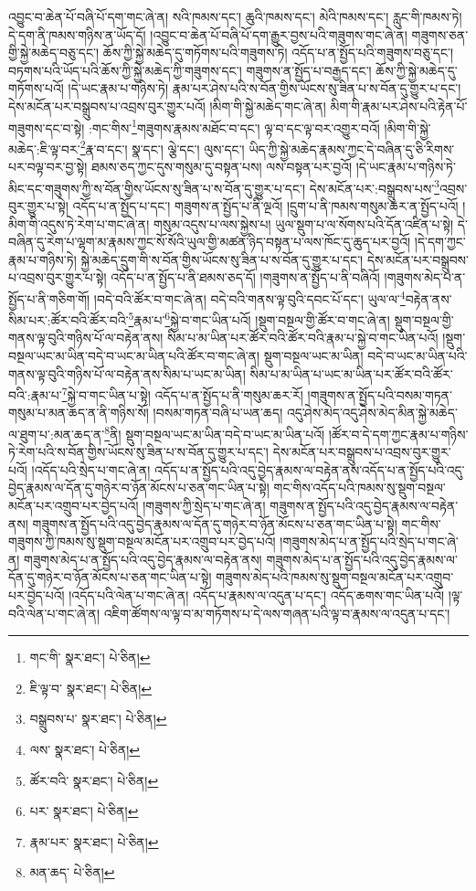 འབྱུང་བ་ཆེན་པོ་བཞི་པོ་དག་གང་ཞེ་ན། སའི་ཁམས་དང་། ཆུའི་ཁམས་དང་། མེའི་ཁམས་དང་། རླུང་གི་ཁམས་ཏེ། དེ་དག་ནི་ཁམས་གཉིས་ན་ཡོད་དོ། །འབྱུང་བ་ཆེན་པོ་བཞི་པོ་དག་རྒྱུར་བྱས་པའི་གཟུགས་གང་ཞེ་ན། གཟུགས་ཅན་གྱི་སྐྱེ་མཆེད་བཅུ་དང་། ཆོས་ཀྱི་སྐྱེ་མཆེད་དུ་གཏོགས་པའི་གཟུགས་ཏེ། འདོད་པ་ན་སྤྱོད་པའི་གཟུགས་བཅུ་དང་། བཏགས་པའི་ཡོད་པའི་ཆོས་ཀྱི་སྐྱེ་མཆེད་ཀྱི་གཟུགས་དང་། གཟུགས་ན་སྤྱོད་པ་བརྒྱད་དང་། ཆོས་ཀྱི་སྐྱེ་མཆེད་དུ་གཏོགས་པའོ། །དེ་ཡང་རྣམ་པ་གཉིས་ཏེ། རྣམ་པར་ཤེས་པའི་ས་བོན་གྱིས་ཡོངས་སུ་ཟིན་པ་ས་བོན་དུ་གྱུར་པ་དང་། དེས་མངོན་པར་བསྒྲུབས་པ་འབྲས་བུར་གྱུར་པའོ། །མིག་གི་སྐྱེ་མཆེད་གང་ཞེ་ན། མིག་གི་རྣམ་པར་ཤེས་པའི་རྟེན་པོ་གཟུགས་དང་བ་སྟེ། :གང་གིས་\footnote{གང་གི་  སྣར་ཐང་།  པེ་ཅིན། }གཟུགས་རྣམས་མཐོང་བ་དང་། ལྟ་བ་དང་ལྟ་བར་འགྱུར་བའོ། །མིག་གི་སྐྱེ་མཆེད་:ཇི་ལྟ་བར་\footnote{ཇི་ལྟ་བ་  སྣར་ཐང་།  པེ་ཅིན། }རྣ་བ་དང་། སྣ་དང་། ལྕེ་དང་། ལུས་དང་། ཡིད་ཀྱི་སྐྱེ་མཆེད་རྣམས་ཀྱང་དེ་བཞིན་དུ་ཅི་རིགས་པར་བལྟ་བར་བྱ་སྟེ། ཐམས་ཅད་ཀྱང་དུས་གསུམ་དུ་བསྟན་པས། ལས་བསྟན་པར་བྱའོ། །དེ་ཡང་རྣམ་པ་གཉིས་ཏེ་མིང་དང་གཟུགས་ཀྱི་ས་བོན་གྱིས་ཡོངས་སུ་ཟིན་པ་ས་བོན་དུ་གྱུར་པ་དང་། དེས་མངོན་པར་:བསྒྲུབས་པས་\footnote{བསྒྲུབས་པ་  སྣར་ཐང་།  པེ་ཅིན། }འབྲས་བུར་གྱུར་པ་སྟེ། འདོད་པ་ན་སྤྱོད་པ་དང་། གཟུགས་ན་སྤྱོད་པ་ནི་ལྔའོ། །དྲུག་པ་ནི་ཁམས་གསུམ་ཆར་ན་སྤྱོད་པའོ། །མིག་གི་འདུས་ཏེ་རེག་པ་གང་ཞེ་ན། གསུམ་འདུས་པ་ལས་སྐྱེས་པ། ཡུལ་སྡུག་པ་ལ་སོགས་པའི་དོན་འཛིན་པ་སྟེ། དེ་བཞིན་དུ་རེག་པ་ལྷག་མ་རྣམས་ཀྱང་སོ་སོའི་ཡུལ་གྱི་མཚན་ཉིད་བསྟན་པ་ལས་ཁོང་དུ་ཆུད་པར་བྱའོ། །དེ་དག་ཀྱང་རྣམ་པ་གཉིས་ཏེ། སྐྱེ་མཆེད་དྲུག་གི་ས་བོན་གྱིས་ཡོངས་སུ་ཟིན་པ་ས་བོན་དུ་གྱུར་པ་དང་། དེས་མངོན་པར་བསྒྲུབས་པ་འབྲས་བུར་གྱུར་པ་སྟེ། འདོད་པ་ན་སྤྱོད་པ་ནི་ཐམས་ཅད་དོ། །གཟུགས་ན་སྤྱོད་པ་ནི་བཞིའོ། །གཟུགས་མེད་པ་ན་སྤྱོད་པ་ནི་གཅིག་གོ། །བདེ་བའི་ཚོར་བ་གང་ཞེ་ན། བདེ་བའི་གནས་ལྟ་བུའི་དབང་པོ་དང་། ཡུལ་ལ་\footnote{ལས་  སྣར་ཐང་།  པེ་ཅིན། }བརྟེན་ནས་སིམ་པར་:ཚོར་བའི་ཚོར་བའི་\footnote{ཚོར་བའི་  སྣར་ཐང་།  པེ་ཅིན། }རྣམ་པ་\footnote{པར་  སྣར་ཐང་།  པེ་ཅིན། }སྐྱེ་བ་གང་ཡིན་པའོ། །སྡུག་བསྔལ་གྱི་ཚོར་བ་གང་ཞེ་ན། སྡུག་བསྔལ་གྱི་གནས་ལྟ་བུའི་གཉིས་པོ་ལ་བརྟེན་ནས། སིམ་པ་མ་ཡིན་པར་ཚོར་བའི་ཚོར་བའི་རྣམ་པ་སྐྱེ་བ་གང་ཡིན་པའོ། །སྡུག་བསྔལ་ཡང་མ་ཡིན་བདེ་བ་ཡང་མ་ཡིན་པའི་ཚོར་བ་གང་ཞེ་ན། སྡུག་བསྔལ་ཡང་མ་ཡིན། བདེ་བ་ཡང་མ་ཡིན་པའི་གནས་ལྟ་བུའི་གཉིས་པོ་ལ་བརྟེན་ནས་སིམ་པ་ཡང་མ་ཡིན། སིམ་པ་མ་ཡིན་པ་ཡང་མ་ཡིན་པར་ཚོར་བའི་ཚོར་བའི་:རྣམ་པ་\footnote{རྣམ་པར་  སྣར་ཐང་།  པེ་ཅིན། }སྐྱེ་བ་གང་ཡིན་པ་སྟེ། འདོད་པ་ན་སྤྱོད་པ་ནི་གསུམ་ཆར་རོ། །གཟུགས་ན་སྤྱོད་པའི་བསམ་གཏན་གསུམ་པ་མན་ཆད་ན་ནི་གཉིས་སོ། །བསམ་གཏན་བཞི་པ་ཡན་ཆད། འདུ་ཤེས་མེད་འདུ་ཤེས་མེད་མིན་སྐྱེ་མཆེད་ལ་ཐུག་པ་:མན་ཆད་ན་\footnote{མན་ཆད་  པེ་ཅིན། }ནི། སྡུག་བསྔལ་ཡང་མ་ཡིན་བདེ་བ་ཡང་མ་ཡིན་པའོ། །ཚོར་བ་དེ་དག་ཀྱང་རྣམ་པ་གཉིས་ཏེ་རེག་པའི་ས་བོན་གྱིས་ཡོངས་སུ་ཟིན་པ་ས་བོན་དུ་གྱུར་པ་དང་། དེས་མངོན་པར་བསྒྲུབས་པ་འབྲས་བུར་གྱུར་པའོ། །འདོད་པའི་སྲེད་པ་གང་ཞེ་ན། འདོད་པ་ན་སྤྱོད་པའི་འདུ་བྱེད་རྣམས་ལ་བརྟེན་ནས་འདོད་པ་ན་སྤྱོད་པའི་འདུ་བྱེད་རྣམས་ལ་དོན་དུ་གཉེར་བ་ཉོན་མོངས་པ་ཅན་གང་ཡིན་པ་སྟེ། གང་གིས་འདོད་པའི་ཁམས་སུ་སྡུག་བསྔལ་མངོན་པར་འགྲུབ་པར་བྱེད་པའོ། །གཟུགས་ཀྱི་སྲེད་པ་གང་ཞེ་ན། གཟུགས་ན་སྤྱོད་པའི་འདུ་བྱེད་རྣམས་ལ་བརྟེན་ནས། གཟུགས་ན་སྤྱོད་པའི་འདུ་བྱེད་རྣམས་ལ་དོན་དུ་གཉེར་བ་ཉོན་མོངས་པ་ཅན་གང་ཡིན་པ་སྟེ། གང་གིས་གཟུགས་ཀྱི་ཁམས་སུ་སྡུག་བསྔལ་མངོན་པར་འགྲུབ་པར་བྱེད་པའོ། །གཟུགས་མེད་པ་ན་སྤྱོད་པའི་སྲེད་པ་གང་ཞེ་ན། གཟུགས་མེད་པ་ན་སྤྱོད་པའི་འདུ་བྱེད་རྣམས་ལ་བརྟེན་ནས། གཟུགས་མེད་པ་ན་སྤྱོད་པའི་འདུ་བྱེད་རྣམས་ལ་དོན་དུ་གཉེར་བ་ཉོན་མོངས་པ་ཅན་གང་ཡིན་པ་སྟེ། གཟུགས་མེད་པའི་ཁམས་སུ་སྡུག་བསྔལ་མངོན་པར་འགྲུབ་པར་བྱེད་པའོ། །འདོད་པའི་ལེན་པ་གང་ཞེ་ན། འདོད་པ་རྣམས་ལ་འདུན་པ་དང་། འདོད་ཆགས་གང་ཡིན་པའོ། །ལྟ་བའི་ལེན་པ་གང་ཞེ་ན། འཇིག་ཚོགས་ལ་ལྟ་བ་མ་གཏོགས་པ་དེ་ལས་གཞན་པའི་ལྟ་བ་རྣམས་ལ་འདུན་པ་དང་། 